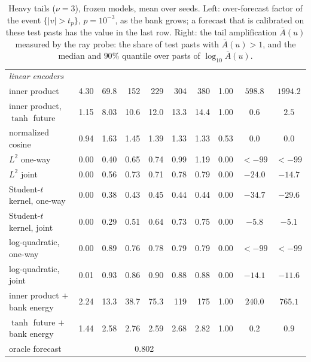 \documentclass[11pt]{article}
\theoremstyle{plain}
\theoremstyle{definition}
\theoremstyle{remark}
\newcommand{\abs}[1]{\left\lvert #1 \right\rvert}
\begin{document}
\begin{table}[ht]
\begin{tabular}{lrrrrrr|ccc}
  \midrule
  \multicolumn{10}{l}{\emph{linear encoders}} \\
  inner product & 4.30 & 69.8 & 152 & 229 & 304 & 380 & 1.00 & $598.8$ & $1994.2$ \\
  inner product, $\tanh$ future & 1.15 & 8.03 & 10.6 & 12.0 & 13.3 & 14.4 & 1.00 & $0.6$ & $2.5$ \\
  normalized cosine & 0.94 & 1.63 & 1.45 & 1.39 & 1.33 & 1.33 & 0.53 & $0.0$ & $0.0$ \\
  $L^2$ one-way & 0.00 & 0.40 & 0.65 & 0.74 & 0.99 & 1.19 & 0.00 & $<-99$ & $<-99$ \\
  $L^2$ joint & 0.00 & 0.56 & 0.73 & 0.71 & 0.78 & 0.79 & 0.00 & $-24.0$ & $-14.7$ \\
  Student-$t$ kernel, one-way & 0.00 & 0.38 & 0.43 & 0.45 & 0.44 & 0.44 & 0.00 & $-34.7$ & $-29.6$ \\
  Student-$t$ kernel, joint & 0.00 & 0.29 & 0.51 & 0.64 & 0.73 & 0.75 & 0.00 & $-5.8$ & $-5.1$ \\
  log-quadratic, one-way & 0.00 & 0.89 & 0.76 & 0.78 & 0.79 & 0.79 & 0.00 & $<-99$ & $<-99$ \\
  log-quadratic, joint & 0.01 & 0.93 & 0.86 & 0.90 & 0.88 & 0.88 & 0.00 & $-14.1$ & $-11.6$ \\
  inner product $+$ bank energy & 2.24 & 13.3 & 38.7 & 75.3 & 119 & 175 & 1.00 & $240.0$ & $765.1$ \\
  $\tanh$ future $+$ bank energy & 1.44 & 2.58 & 2.76 & 2.59 & 2.68 & 2.82 & 1.00 & $0.2$ & $0.9$ \\
  \midrule
  oracle forecast & \multicolumn{6}{c}{0.802} & & & \\
  \bottomrule
 \end{tabular}
 \caption{Heavy tails ($\nu=3$), frozen models, mean over seeds. Left:
  over-forecast factor of the event $\{\abs{v}>t_p\}$, $p=10^{-3}$, as the
  bank grows; a forecast that is calibrated on these test pasts has the value
  in the last row. Right: the tail amplification $\bar A(u)$ measured by the
  ray probe: the share of test pasts with $\bar A(u)>1$, and the median and
  $90\%$ quantile over pasts of $\log_{10}\bar A(u)$.}
 \label{tab:overforecast}
\end{table}
\end{document}
